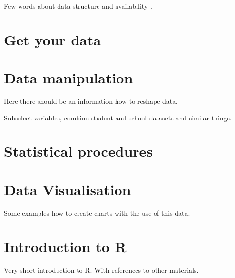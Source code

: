 \documentclass{tufte-book}
\begin{document}
Few words about data structure and availability \cite{PISAwebsite} \cite{OECDwebsite}.

\chapter{Get your data}


\chapter{Data manipulation}
Here there should be an information how to reshape data.

Subselect variables, combine student and school datasets and similar things.

\chapter{Statistical procedures}


\chapter{Data Visualisation}

Some examples how to create charts with the use of this data. 

\backmatter

\chapter{Introduction to R}
\label{sec:introToR}
Very short introduction to R. With references to other materials.




\printindex
\end{document}
